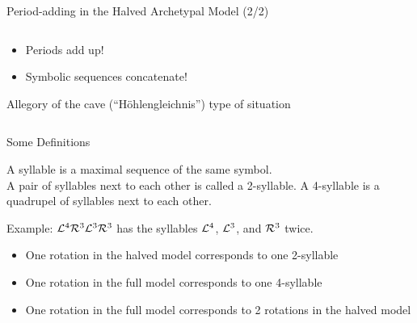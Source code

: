 \begin{frame}{Period-adding in the Halved Archetypal Model (2/2)}
	\begin{columns}
		\begin{column}{.7 \textwidth}
			\begin{itemize}
				\item Periods add up!
				\item Symbolic sequences concatenate!
			\end{itemize}
			\pause
			\begin{center}
			\end{center}
			\vspace{1em}
			\pause
			Allegory of the cave (``Höhlengleichnis'') type of situation
		\end{column}
		\begin{column}{.3 \textwidth}
			\vspace{2em}
			\only<3->{
				\begin{figure}
					\texttt{[image: Figs/allegory.jpeg]}
				\end{figure}
			}
		\end{column}
	\end{columns}
\end{frame}

\begin{frame}{Some Definitions}
	\vspace{-1em}
	\begin{definition}[Syllables]
		A syllable is a maximal sequence of the same symbol. \\[1em]
		A pair of syllables next to each other is called a 2-syllable.
		A 4-syllable is a quadrupel of syllables next to each other.
	\end{definition}
	\pause
	Example: $\mathcal{L}^4\mathcal{R}^3\mathcal{L}^3\mathcal{R}^3$ has the syllables $\mathcal{L}^4$, $\mathcal{L}^3$, and $\mathcal{R}^3$ twice.
	\vspace{1em}
	\begin{itemize}
		\pause
		\item One rotation in the halved model corresponds to one 2-syllable \pause
		\item One rotation in the full model corresponds to one 4-syllable \pause
		\item One rotation in the full model corresponds to 2 rotations in the halved model
	\end{itemize}
\end{frame}

